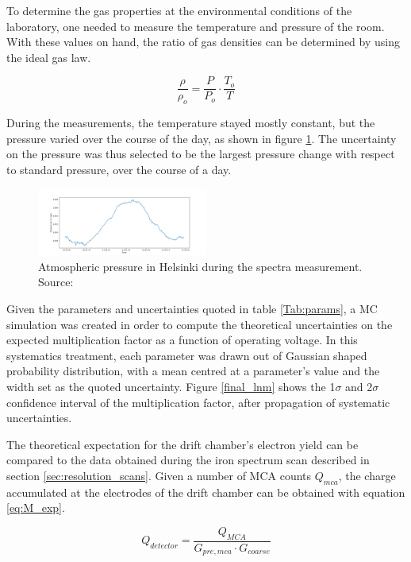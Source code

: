 To determine the gas properties at the environmental conditions of the laboratory, one needed to measure the temperature and pressure of the room. With these values on hand, the ratio of gas densities can be determined by using the ideal gas law.

\begin{equation}
  \label{eq:gaslaw}
  \frac{\rho}{\rho_{o}} = \frac{P}{P_{o}}\cdot \frac{T_{o}}{T}
\end{equation}

During the measurements, the temperature stayed mostly constant, but the pressure varied over the course of the day, as shown in figure \ref{fig:pressure}. The uncertainty on the pressure was thus selected to be the largest pressure change with respect to standard pressure, over the course of a day.

\begin{figure}[htb]
  \includegraphics[width=0.5\textwidth]{graphics/pressure_monitoring.png}
  \caption{Atmospheric pressure in Helsinki during the spectra measurement. Source: \cite{meteo}}
  \label{fig:pressure}
\end{figure}

Given the parameters and uncertainties quoted in table \ref{Tab:params}, a MC simulation was created in order to compute the theoretical uncertainties on the expected multiplication factor as a function of operating voltage. In this systematics treatment, each parameter was drawn out of Gaussian shaped probability distribution, with a mean centred at a parameter's value and the width set as the quoted uncertainty. Figure \ref{final_lnm} shows the 1$\sigma$ and 2$\sigma$ confidence interval of the multiplication factor, after propagation of systematic uncertainties.

The theoretical expectation for the drift chamber's electron yield can be compared to the data obtained during the iron spectrum scan described in section \ref{sec:resolution_scans}. Given a number of MCA counts $Q_{mca}$, the charge accumulated at the electrodes of the drift chamber can be obtained with equation \ref{eq:M_exp}.

\begin{equation}
  \label{eq:M_exp}
  Q_{detector} = \frac{Q_{MCA}}{G_{pre,mca}\cdot{G_{coarse}}}
\end{equation}

